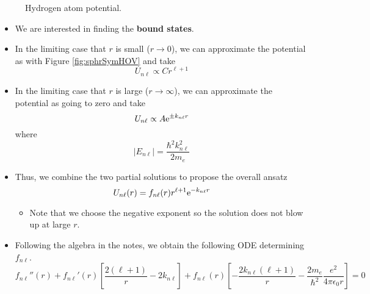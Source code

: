 \documentclass[../notes.tex]{subfiles}
\begin{document}
\begin{itemize}
\begin{figure}[h!]
        \caption{Hydrogen atom potential.}
        \label{fig:1HV}
    \end{figure}
    \begin{itemize}
        \item We are interested in finding the \textbf{bound states}.
        \item In the limiting case that $r$ is small ($r\to 0$), we can approximate the potential as with Figure \ref{fig:sphrSymHOV} and take
        \begin{equation*}
            U_{n\ell} \propto Cr^{\ell+1}
        \end{equation*}
        \item In the limiting case that $r$ is large ($r\to \infty$), we can approximate the potential as going to zero and take
        \begin{equation*}
            U_{n\ell} \propto A\e[\pm k_{n\ell}r]
        \end{equation*}
        where
        \begin{equation*}
            |E_{n\ell}| = \frac{\hbar^2k_{n\ell}^2}{2m_e}
        \end{equation*}
        \item Thus, we combine the two partial solutions to propose the overall ansatz
        \begin{equation*}
            U_{n\ell}(r) = f_{n\ell}(r)r^{\ell+1}\e[-k_{n\ell}r]
        \end{equation*}
        \begin{itemize}
            \item Note that we choose the negative exponent so the solution does not blow up at large $r$.
        \end{itemize}
        \item Following the algebra in the notes, we obtain the following ODE determining $f_{n\ell}$.
        \begin{equation*}
            f_{n\ell}''(r)+f_{n\ell}'(r)\left[ \frac{2(\ell+1)}{r}-2k_{n\ell} \right]+f_{n\ell}(r)\left[ -\frac{2k_{n\ell}(\ell+1)}{r}-\frac{2m_e}{\hbar^2}\frac{e^2}{4\pi\epsilon_0r} \right] = 0

\end{equation*}
\end{itemize}
\end{itemize}
\end{document}
